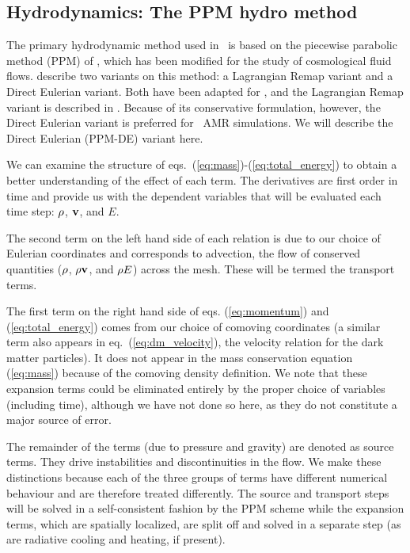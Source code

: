 \subsection{Hydrodynamics: The PPM hydro method}
\label{sec.hydro.ppm}

The primary hydrodynamic method used in \enzo\ is based on the
piecewise parabolic method (PPM) of
\citet{1984JCoPh..54..174C}, which has been
modified for the study of cosmological fluid flows.  
\citet{1984JCoPh..54..174C} describe two variants on this method: a
Lagrangian Remap variant and a Direct Eulerian variant.  Both have
been adapted for \enzo, and the Lagrangian Remap 
variant is described in \citet{1995CoPhC..89..149B}.  Because of its
conservative formulation, however, the Direct Eulerian variant is
preferred for \enzo\ AMR simulations.  We will describe the Direct
Eulerian (PPM-DE) variant here.

We can examine the structure of eqs.~(\ref{eq:mass})-(\ref{eq:total_energy})
to obtain a better understanding of the effect of each term.
The derivatives are first order in time
and provide us with the dependent variables that will be evaluated each
time step: $\rho$, $\mathbf{v}$, and $E$.

The second term on the left hand side of each relation
is due to our choice of Eulerian coordinates and corresponds to
advection, the flow of conserved quantities 
($\rho$, $\rho \mathbf{v}$, and $\rho E$) 
across the mesh.  These will be termed the transport terms.

The first term on the right hand side of eqs. (\ref{eq:momentum}) and
(\ref{eq:total_energy}) comes from our choice of comoving coordinates
(a similar term also appears in eq.~(\ref{eq:dm_velocity}), the velocity 
relation for the dark matter particles).  It does not
appear in the mass conservation equation (\ref{eq:mass}) because
of the comoving density definition.   
We note that these expansion terms could be
eliminated entirely by the proper choice of variables (including time),
although we have not done so here, as they do not constitute a major
source of error.

The remainder of the terms (due to pressure and gravity) are denoted as
source terms.  They drive instabilities and discontinuities in the flow.
We make these distinctions because each of the three
groups of terms have different numerical behaviour and are therefore
treated differently.  The source and transport steps will be solved in
a self-consistent fashion by the PPM scheme while the expansion terms,
which are spatially localized, are split off and solved in a separate step
(as are radiative cooling and heating, if present).  

